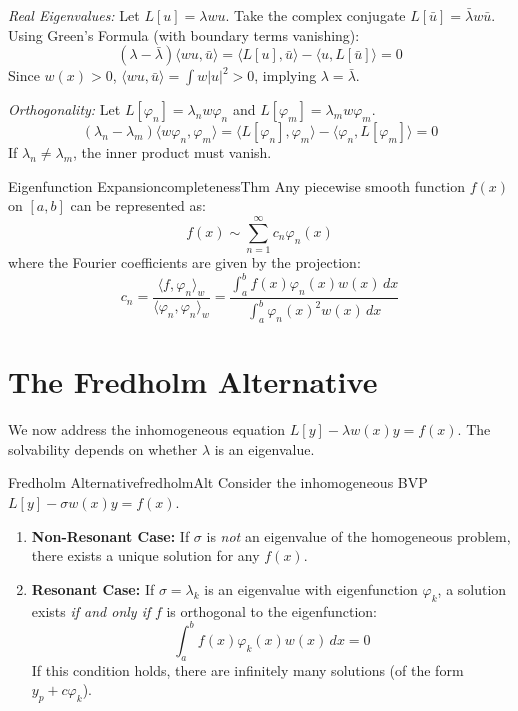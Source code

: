 \documentclass{book}
\newenvironment{Proof}[1][]
  {\begin{ProofTcb}[#1]}
  {\end{ProofTcb}}
\renewcommand{\phi}{\varphi}
\begin{document}
\begin{Proof}
    \emph{Real Eigenvalues:} Let $L[u] = \lambda w u$. Take the complex conjugate $L[\bar{u}] = \bar{\lambda} w \bar{u}$.
    Using Green's Formula (with boundary terms vanishing):
    \[
        (\lambda - \bar{\lambda}) \langle w u, \bar{u} \rangle = \langle L[u], \bar{u} \rangle - \langle u, L[\bar{u}] \rangle = 0
    \]
    Since $w(x) > 0$, $\langle w u, \bar{u} \rangle = \int w |u|^2 > 0$, implying $\lambda = \bar{\lambda}$.

    \emph{Orthogonality:} Let $L[\phi_n] = \lambda_n w \phi_n$ and $L[\phi_m] = \lambda_m w \phi_m$.
    \[
        (\lambda_n - \lambda_m) \langle w \phi_n, \phi_m \rangle = \langle L[\phi_n], \phi_m \rangle - \langle \phi_n, L[\phi_m] \rangle = 0
    \]
    If $\lambda_n \ne \lambda_m$, the inner product must vanish.
\end{Proof}

\begin{thm}{Eigenfunction Expansion}{completenessThm}
    Any piecewise smooth function $f(x)$ on $[a,b]$ can be represented as:
    \[
        f(x) \sim \sum_{n=1}^\infty c_n \phi_n(x)
    \]
    where the Fourier coefficients are given by the projection:
    \[
        c_n = \frac{\langle f, \phi_n \rangle_w}{\langle \phi_n, \phi_n \rangle_w} = \frac{\int_a^b f(x)\phi_n(x)w(x) \, dx}{\int_a^b \phi_n(x)^2 w(x) \, dx}
    \]
\end{thm}

\section{The Fredholm Alternative}

We now address the inhomogeneous equation $L[y] - \lambda w(x) y = f(x)$. The solvability depends on whether $\lambda$ is an eigenvalue.

\begin{thm}{Fredholm Alternative}{fredholmAlt}
    Consider the inhomogeneous BVP $L[y] - \sigma w(x)y = f(x)$.
    \begin{enumerate}
        \item \textbf{Non-Resonant Case:} If $\sigma$ is \emph{not} an eigenvalue of the homogeneous problem, there exists a unique solution for any $f(x)$.
        \item \textbf{Resonant Case:} If $\sigma = \lambda_k$ is an eigenvalue with eigenfunction $\phi_k$, a solution exists \emph{if and only if} $f$ is orthogonal to the eigenfunction:
        \[
            \int_a^b f(x)\phi_k(x) w(x) \, dx = 0
        \]
        If this condition holds, there are infinitely many solutions (of the form $y_p + c\phi_k$).
    \end{enumerate}
\end{thm}
\end{document}
